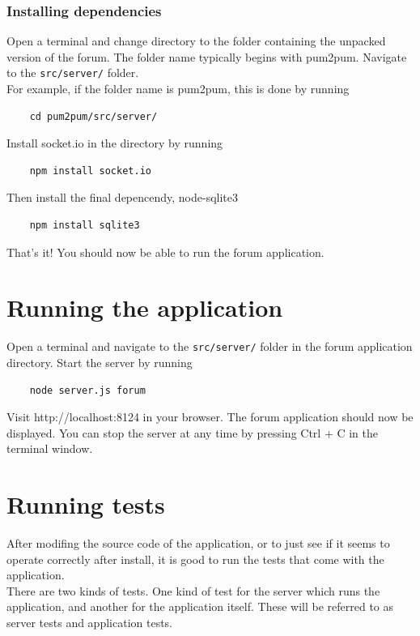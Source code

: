 \documentclass[a4paper, 12pt, titlepage]{article}
\begin{document}
	\subsubsection{Installing dependencies}
	Open a terminal and change directory to the folder containing the unpacked version of the forum. The folder name typically begins with pum2pum. Navigate to the \lstinline{src/server/} folder.\\
	For example, if the folder name is pum2pum, this is done by running
	\begin{lstlisting}
	cd pum2pum/src/server/
	\end{lstlisting}

	Install socket.io in the directory by running
	\begin{lstlisting}
	npm install socket.io
	\end{lstlisting}

	Then install the final depencendy, node-sqlite3
	\begin{lstlisting}
	npm install sqlite3
	\end{lstlisting}

	That's it! You should now be able to run the forum application.


	\section{Running the application}
	Open a terminal and navigate to the \lstinline{src/server/} folder in the forum application directory. Start the server by running
	\begin{lstlisting}
	node server.js forum
	\end{lstlisting}

	Visit http://localhost:8124 in your browser. The forum application should now be displayed. You can stop the server at any time by pressing Ctrl + C in the terminal window.


	\section{Running tests}
	After modifing the source code of the application, or to just see if it seems to operate correctly after install, it is good to run the tests that come with the application.\\

	There are two kinds of tests. One kind of test for the server which runs the application, and another for the application itself. These will be referred to as server tests and application tests.
\end{document}
